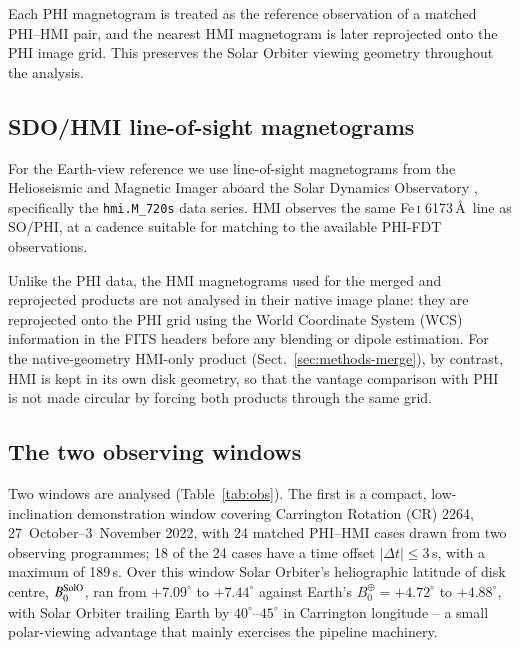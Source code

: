 \documentclass{aa}
\begin{document}
Each PHI magnetogram is treated as the reference observation of a matched PHI--HMI pair, and the nearest HMI magnetogram is later reprojected onto the PHI image grid. This preserves the Solar Orbiter viewing geometry throughout the analysis.

\subsection{SDO/HMI line-of-sight magnetograms}
\label{sec:data-hmi}

For the Earth-view reference we use line-of-sight magnetograms from the Helioseismic and Magnetic Imager \citep[HMI;][]{Scherrer2012} aboard the Solar Dynamics Observatory \citep[SDO;][]{Pesnell2012}, specifically the \texttt{hmi.M\_720s} data series. HMI observes the same Fe\,\textsc{i} 6173\,\AA\ line as SO/PHI, at a cadence suitable for matching to the available PHI-FDT observations.

Unlike the PHI data, the HMI magnetograms used for the merged and reprojected products are not analysed in their native image plane: they are reprojected onto the PHI grid using the World Coordinate System (WCS) information in the FITS headers \citep{Thompson2006} before any blending or dipole estimation. For the native-geometry HMI-only product (Sect.~\ref{sec:methods-merge}), by contrast, HMI is kept in its own disk geometry, so that the vantage comparison with PHI is not made circular by forcing both products through the same grid.

\subsection{The two observing windows}
\label{sec:data-windows}

Two windows are analysed (Table~\ref{tab:obs}). The first is a compact, low-inclination demonstration window covering Carrington Rotation (CR) 2264, 27~October--3~November 2022, with 24 matched PHI--HMI cases drawn from two observing programmes; 18 of the 24 cases have a time offset $|\Delta t| \le 3$\,s, with a maximum of 189\,s. Over this window Solar Orbiter's heliographic latitude of disk centre, $B_0^{\rm SolO}$, ran from $+7.09^{\circ}$ to $+7.44^{\circ}$ against Earth's $B_0^{\oplus} = +4.72^{\circ}$ to $+4.88^{\circ}$, with Solar Orbiter trailing Earth by $40^{\circ}$--$45^{\circ}$ in Carrington longitude -- a small polar-viewing advantage that mainly exercises the pipeline machinery.
\end{document}
